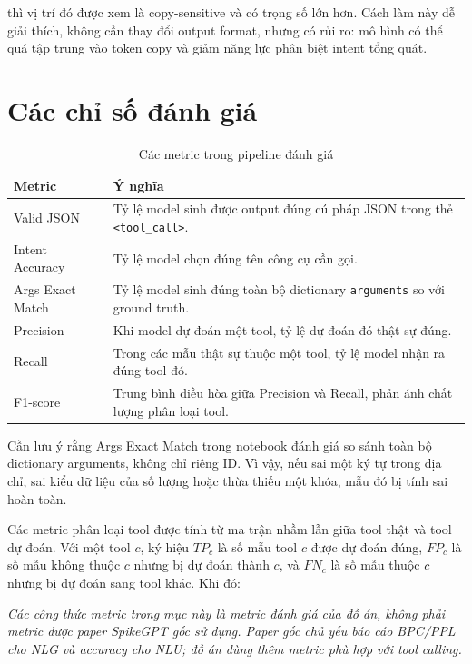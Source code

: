 \documentclass[12pt,a4paper,oneside]{report}
\newlength{\manualparindent}
\newcommand{\manualindent}{\hspace*{\manualparindent}}
\begin{document}
\manualindent%
thì vị trí đó được xem là copy-sensitive và có trọng số lớn hơn. Cách làm này dễ giải thích, không cần thay đổi output format, nhưng có rủi ro: mô hình có thể quá tập trung vào token copy và giảm năng lực phân biệt intent tổng quát.

\section{Các chỉ số đánh giá}

\begin{table}[H]
\centering
\caption{Các metric trong pipeline đánh giá}
\begin{tabularx}{\textwidth}{p{3.5cm}X}
\toprule
\textbf{Metric} & \textbf{Ý nghĩa} \\
\midrule
Valid JSON & Tỷ lệ model sinh được output đúng cú pháp JSON trong thẻ \texttt{<tool\_call>}. \\
Intent Accuracy & Tỷ lệ model chọn đúng tên công cụ cần gọi. \\
Args Exact Match & Tỷ lệ model sinh đúng toàn bộ dictionary \texttt{arguments} so với ground truth. \\
Precision & Khi model dự đoán một tool, tỷ lệ dự đoán đó thật sự đúng. \\
Recall & Trong các mẫu thật sự thuộc một tool, tỷ lệ model nhận ra đúng tool đó. \\
F1-score & Trung bình điều hòa giữa Precision và Recall, phản ánh chất lượng phân loại tool. \\
\bottomrule
\end{tabularx}
\end{table}

\manualindent%
Cần lưu ý rằng Args Exact Match trong notebook đánh giá so sánh toàn bộ dictionary arguments, không chỉ riêng ID. Vì vậy, nếu sai một ký tự trong địa chỉ, sai kiểu dữ liệu của số lượng hoặc thừa thiếu một khóa, mẫu đó bị tính sai hoàn toàn.

\manualindent%
Các metric phân loại tool được tính từ ma trận nhầm lẫn giữa tool thật và tool dự đoán. Với một tool \(c\), ký hiệu \(TP_c\) là số mẫu tool \(c\) được dự đoán đúng, \(FP_c\) là số mẫu không thuộc \(c\) nhưng bị dự đoán thành \(c\), và \(FN_c\) là số mẫu thuộc \(c\) nhưng bị dự đoán sang tool khác. Khi đó:

\manualindent%
\textit{Các công thức metric trong mục này là metric đánh giá của đồ án, không phải metric được paper SpikeGPT gốc sử dụng. Paper gốc chủ yếu báo cáo BPC/PPL cho NLG và accuracy cho NLU; đồ án dùng thêm metric phù hợp với tool calling.}
\end{document}
